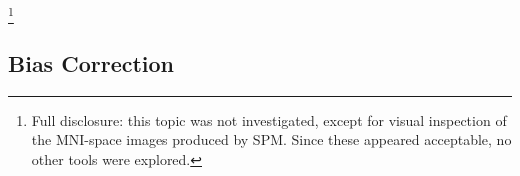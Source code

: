 \footnote{Full disclosure: this topic was not investigated, except for visual inspection of the MNI-space images produced by SPM. Since these appeared acceptable, no other tools were explored.}

\subsection{Bias Correction}\label{ss:meth-bias}
\clearpage
